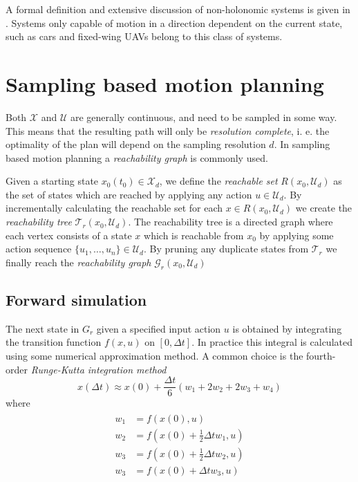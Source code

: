 A formal definition and extensive discussion of non-holonomic systems is given 
in \cite[Chapter~15]{planning_algorithms}. Systems only capable of motion in a direction 
dependent on the current state, such as cars and fixed-wing UAVs belong to this class of systems.

\section{Sampling based motion planning}
Both $\mathcal{X}$ and $\mathcal{U}$ are generally continuous, and need to be sampled 
in some way. This means that the resulting path will only be \textit{resolution complete}, i. e. 
the optimality of the plan will depend on the sampling resolution $d$. In sampling based
motion planning a \textit{reachability graph} is commonly used.

\begin{definition}\label{def:reach_graph}
    Given a starting state $x_0(t_0)\in\mathcal{X}_d$, we define the \textit{reachable set} 
    $R(x_0, \mathcal{U}_d)$ as the set of states which are reached by applying any action $u\in\mathcal{U}_d$.
    By incrementally calculating the reachable set for each $x\in R(x_0, \mathcal{U}_d)$ we create the \textit{reachability tree} $\mathcal{T}_r(x_0, \mathcal{U}_d)$.
    The reachability tree is a directed graph where each vertex consists of a state $x$ which is reachable from $x_0$ by applying some action sequence 
    $\{u_1,\hdots,u_n\}\in\mathcal{U}_d$. By pruning any duplicate states from $\mathcal{T}_r$ we finally reach the \textit{reachability graph} $\mathcal{G}_r(x_0, \mathcal{U}_d)$
\end{definition}

\subsection{Forward simulation}
The next state in $G_r$ given a specified input action $u$ is obtained by 
integrating the transition function $f(x, u)$ on $[0, \Delta t]$. In practice this 
integral is calculated using some numerical approximation method. A common choice is the 
fourth-order \textit{Runge-Kutta integration method}
\begin{equation}
    x(\Delta t)\approx x(0) + \frac{\Delta t}{6}(w_1 + 2w_2 + 2w_3 + w_4)
\end{equation}
where
\begin{align}
\begin{split}
    w_1 &= f(x(0), u) \\
    w_2 &= f(x(0) + \frac{1}{2}\Delta t w_1, u) \\
    w_3 &= f(x(0) + \frac{1}{2}\Delta t w_2, u) \\
    w_3 &= f(x(0) + \Delta t w_3, u)
\end{split}
\end{align}

